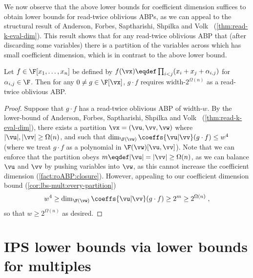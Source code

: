 \documentclass{toc}
\begin{document}
We now observe that the above lower bounds for coefficient dimension suffices to obtain lower bounds for read-twice oblivious ABPs, as we can appeal to the structural result of Anderson, Forbes, Saptharishi, Shpilka and Volk~\cite{AndersonFSSV16} (\autoref{thm:read-k-eval-dim}).  This result shows that for any read-twice oblivious ABP that (after discarding some variables) there is a partition of the variables across which has small coefficient dimension, which is in contrast to the above lower bound.

\begin{corollary}\label{cor:r2abp-multiples}
        Let $f\in\F[x_1,\ldots,x_n]$ be defined by $f(\vx)\eqdef\prod_{i<j}(x_i+x_j+\alpha_{i,j})$ for $\alpha_{i,j}\in\F$.  Then for any $0\ne g\in\F[\vx]$, $g\cdot f$ requires width-$2^{\Omega(n)}$ as a read-twice oblivious ABP.
\end{corollary}
\begin{proof}
        Suppose that $g\cdot f$ has a read-twice oblivious ABP of width-$w$. By the lower-bound of Anderson, Forbes, Saptharishi, Shpilka and Volk~\cite{AndersonFSSV16} (\autoref{thm:read-k-eval-dim}), there exists a partition $\vx=(\vu,\vv,\vw)$ where $|\vu|,|\vv|\ge\Omega(n)$, and such that $\dim_{\F(\vw)}\coeffs{\vu|\vv}(g\cdot f)\le w^4$ (where we treat $g\cdot f$ as a polynomial in $\F(\vw)[\vu,\vv]$).  Note that we can  enforce that the partition obeys $m\eqdef|\vu|=|\vv|\ge\Omega(n)$, as we can balance $\vu$ and $\vv$ by pushing variables into $\vw$, as this cannot increase the coefficient dimension (\autoref{fact:roABP:closure}). However, appealing to our coefficient dimension bound (\autoref{cor:lbs-mult:every-partition})
        \[
                w^4\ge\dim_{\F(\vw)}\coeffs{\vu|\vv}(g\cdot f)\ge 2^m\ge 2^{\Omega(n)}
                \;,
        \]
        so that $w\ge2^{\Omega(n)}$ as desired.
\end{proof}

\section{IPS lower bounds via lower bounds for multiples}\label{sec:ips-mult}
\end{document}
